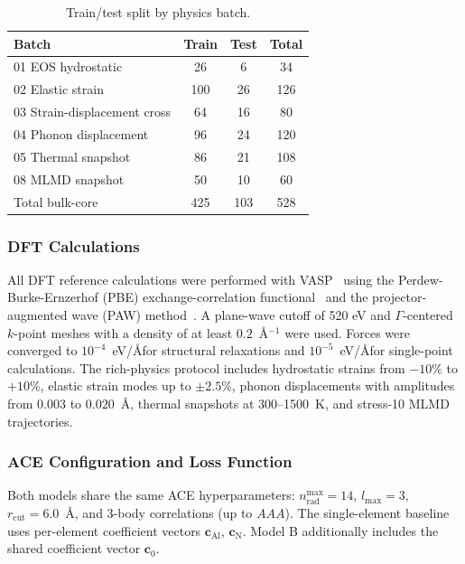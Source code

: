 \documentclass[twoside,prb,aps,floatfix,superscriptaddress,longbibliography]{revtex4-2}
\begin{document}
\begin{table}[t]
\caption{Train/test split by physics batch.}
\label{tab:split}
\begin{ruledtabular}
\begin{tabular}{lccc}
\toprule
Batch & Train & Test & Total \\
\midrule
01 EOS hydrostatic & 26 & 6 & 34 \\
02 Elastic strain & 100 & 26 & 126 \\
03 Strain-displacement cross & 64 & 16 & 80 \\
04 Phonon displacement & 96 & 24 & 120 \\
05 Thermal snapshot & 86 & 21 & 108 \\
08 MLMD snapshot & 50 & 10 & 60 \\
\midrule
Total bulk-core & 425 & 103 & 528 \\
\bottomrule
\end{tabular}
\end{ruledtabular}
\end{table}

\subsubsection{DFT Calculations}

All DFT reference calculations were performed with VASP~\cite{Kresse1996VASP} using the Perdew-Burke-Ernzerhof (PBE) exchange-correlation functional~\cite{Perdew1996PBE} and the projector-augmented wave (PAW) method~\cite{ Blochl1994PAW}. A plane-wave cutoff of 520 eV and $\Gamma$-centered $k$-point meshes with a density of at least $0.2$~\AA$^{-1}$ were used. Forces were converged to $10^{-4}$~eV/\AA for structural relaxations and $10^{-5}$~eV/\AA for single-point calculations. The rich-physics protocol includes hydrostatic strains from $-10\%$ to $+10\%$, elastic strain modes up to $\pm 2.5\%$, phonon displacements with amplitudes from $0.003$ to $0.020$~\AA, thermal snapshots at 300--1500~K, and stress-10 MLMD trajectories.

\subsubsection{ACE Configuration and Loss Function}

Both models share the same ACE hyperparameters: $n_{\mathrm{rad}}^{\mathrm{max}} = 14$, $l_{\mathrm{max}} = 3$, $r_{\mathrm{cut}} = 6.0$~\AA, and 3-body correlations (up to $AAA$). The single-element baseline uses per-element coefficient vectors $\mathbf{c}_{\mathrm{Al}}$, $\mathbf{c}_{\mathrm{N}}$. Model B additionally includes the shared coefficient vector $\mathbf{c}_0$.
\end{document}
